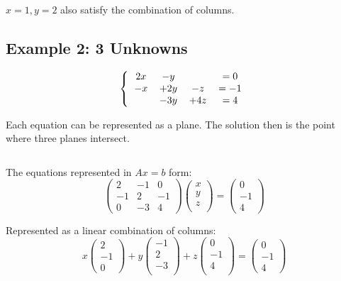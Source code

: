 \documentclass[12pt]{article}
\begin{document}
$x=1,y=2$ also satisfy the combination of columns.

\subsection{Example 2: 3 Unknowns}

\[ 
\left \{
  \begin{tabular}{cccc}
  $2x$ & $-y$ & & $=0$\\
  $-x$ & $+2y$ & $-z$ & $=-1$\\
  & $-3y$ & $+4z$ & $=4$\\
  \end{tabular}
\right
.\]

Each equation can be represented as a plane. The solution then is the point where three planes intersect.

$\>$

The equations represented in $Ax=b$ form:
\[
\left(
    \begin{matrix}
        2 & -1 & 0\\ 
        -1 & 2 & -1\\
        0 & -3 & 4
    \end{matrix}
\right)
\left(
    \begin{matrix}
        x\\ 
        y\\
        z\\
    \end{matrix}
\right)
=
\left(
    \begin{matrix}
        0\\ 
        -1\\
        4
    \end{matrix}
\right)
\]

Represented as a linear combination of columns:
\[
x
\left(
    \begin{matrix}
        2\\ 
        -1\\
        0
    \end{matrix}
\right)
+y
\left(
    \begin{matrix}
        -1\\ 
        2\\
        -3\\
    \end{matrix}
\right)
+z
\left(
    \begin{matrix}
        0\\ 
        -1\\
        4\\
    \end{matrix}
\right)
=
\left(
    \begin{matrix}
        0\\ 
        -1\\
        4
    \end{matrix}
\right)
\]
\end{document}
